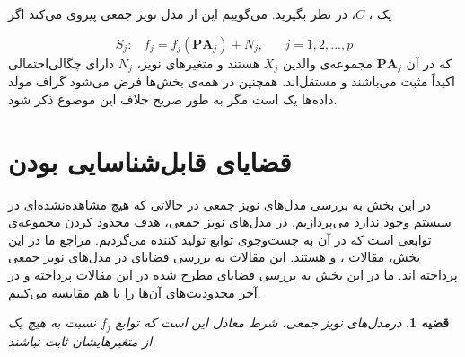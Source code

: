 \documentclass[a4paper,12pt]{article}
\newtheorem{thm}{{\large\bf قضیه}}[section]
\begin{document}
یک 
،
$C$،
در نظر بگیرید. می‌گوییم این 
از مدل نویز جمعی پیروی می‌کند اگر
	
	\begin{equation}
	S_j:\;\;\;f_j=f_j(\textbf{PA}_j) + N_j, \;\;\;\;\;\; j = 1,2,...,p
	\end{equation}
	که در آن 
	$\textbf{PA}_j$
	مجموعه‌ی والدین $X_j$ هستند و متغیرهای نویز، $N_j$ دارای چگالی‌احتمالی اکیداً مثبت می‌باشند و مستقل‌اند. همچنین در همه‌ی بخش‌ها فرض می‌شود گراف مولد داده‌ها یک 
	است مگر به طور صریح خلاف این موضوع ذکر شود.
	

\section{قضایای قابل‌شناسایی بودن}
در این بخش به بررسی مدل‌های نویز جمعی در حالاتی که هیچ 
مشاهده‌نشده‌ای در سیستم وجود ندارد می‌پردازیم. در مدل‌های نویز جمعی، هدف محدود کردن مجموعه‌ی توابعی است که در آن به جست‌و‌جوی توابع تولید کننده  
می‌گردیم.
مراجع ما در این بخش، مقالات 
\cite{hoyer}،
\cite{continous}
و
\cite{postnonlinear}
هستند. این مقالات به بررسی قضایای 
در مدل‌های نویز جمعی پرداخته اند. ما در این بخش به بررسی قضایای مطرح شده در این مقالات پرداخته و در آخر محدودیت‌های  آن‌ها را با هم مقایسه ‌می‌کنیم.

\begin{thm}
	درمدل‌های نویز جمعی، شرط  
	معادل این است که توابع $f_j$ نسبت به هیچ یک از متغیرهایشان ثابت نباشند.
\end{thm}
\end{document}
